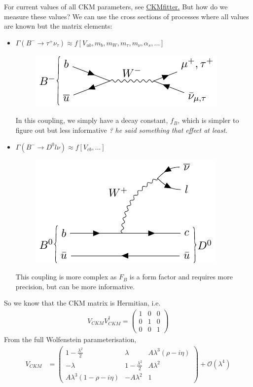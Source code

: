 \documentclass[a4paper, 11pt, normalem]{article}
\begin{document}
For current values of all CKM parameters, see \href{https://ckmfitter.in2p3.fr}{CKMfitter.}
But how do we measure these values?
We can use the cross sections of processes where all values are known but the matrix elements:
\begin{itemize}
    \item $\Gamma(B^-\to\tau^+\nu_{\tau}) \approx f[V_{ub},m_b,m_W,m_\tau,m_\nu,\alpha_s,\dots]$
        \begin{figure}[H]
            \centering
            \includegraphics{ckm_bmin.pdf}
        \end{figure}
        In this coupling, we simply have a decay constant, $f_B$, which is simpler to figure out but less informative \textit{? he said something that effect at least}. 
    \item $\Gamma(B^-\to D^0l\nu) \approx f[V_{cb},\dots]$
        \begin{figure}[H]
            \centering
            \includegraphics{btod.pdf}
        \end{figure}
        This coupling is more complex as $F_B$ is a form factor and requires more precision, but can be more informative. 
\end{itemize}
So we know that the CKM matrix is Hermitian, i.e.
\begin{align}
    V_{CKM}V_{CKM}^\dagger = \begin{pmatrix} 1 & 0 & 0 \\ 0 & 1 & 0 \\ 0 & 0 & 1\end{pmatrix}
\end{align}
From the full Wolfenstein parameterisation,
\begin{align}
    V_{CKM} &= \begin{pmatrix} 1 - \frac{\lambda^2}{2} & \lambda & A\lambda^3(\rho-i\eta) \\ -\lambda & 1-\frac{\lambda^2}{2} & A\lambda^2 \\ A\lambda^3(1-\rho-i\eta) & -A\lambda^2 & 1\end{pmatrix} + \mathcal{O}(\lambda^4) 
\end{align}
\end{document}

